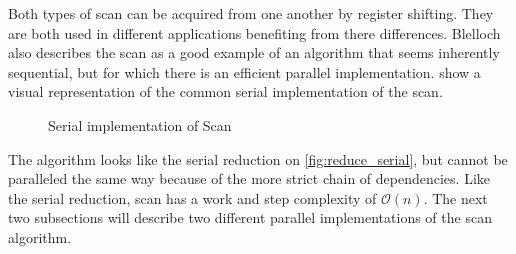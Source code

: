 Both types of scan can be acquired from one another by register shifting. They are both used in different applications benefiting from there differences. Blelloch \cite{BlellochTR90} also describes the scan as a good example of an algorithm that seems inherently sequential, but for which there is an efficient parallel implementation.  show a visual representation of the common serial implementation of the scan.  

\begin{figure}[ht]
	\centering
	\caption{Serial implementation of Scan}
	\label{fig:scan_serial}
\end{figure}

The algorithm looks like the serial reduction on \cref{fig:reduce_serial}, but cannot be paralleled the same way because of the more strict chain of dependencies. Like the serial reduction, scan has a work and step complexity of $\mathcal{O}(n)$. The next two subsections will describe two different parallel implementations of the scan algorithm.